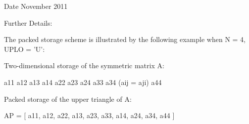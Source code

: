 \begin{DoxyDate}{Date}
November 2011 
\end{DoxyDate}
\begin{DoxyParagraph}{Further Details\+: }
\begin{DoxyVerb}  The packed storage scheme is illustrated by the following example
  when N = 4, UPLO = 'U':

  Two-dimensional storage of the symmetric matrix A:

     a11 a12 a13 a14
         a22 a23 a24
             a33 a34     (aij = aji)
                 a44

  Packed storage of the upper triangle of A:

  AP = [ a11, a12, a22, a13, a23, a33, a14, a24, a34, a44 ]\end{DoxyVerb}
 
\end{DoxyParagraph}

